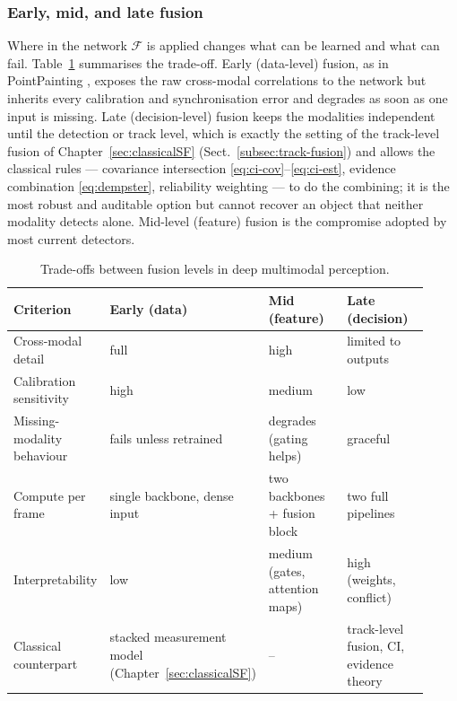 \subsubsection*{Early, mid, and late fusion}
Where in the network $\mathcal{F}$ is applied changes what can be learned and what can fail. Table~\ref{tab:fusion-level-tradeoff} summarises the trade-off. Early (data-level) fusion, as in PointPainting \cite{vora2020_pointpainting}, exposes the raw cross-modal correlations to the network but inherits every calibration and synchronisation error and degrades as soon as one input is missing. Late (decision-level) fusion keeps the modalities independent until the detection or track level, which is exactly the setting of the track-level fusion of Chapter~\ref{sec:classicalSF} (Sect.~\ref{subsec:track-fusion}) and allows the classical rules --- covariance intersection \eqref{eq:ci-cov}--\eqref{eq:ci-est}, evidence combination \eqref{eq:dempster}, reliability weighting --- to do the combining; it is the most robust and auditable option but cannot recover an object that neither modality detects alone. Mid-level (feature) fusion is the compromise adopted by most current detectors.
\begin{table}[!t]
    \centering
    \small
    \setlength{\tabcolsep}{4pt}
    \caption{Trade-offs between fusion levels in deep multimodal perception.}
    \label{tab:fusion-level-tradeoff}
    \begin{tabular}{p{0.17\linewidth} p{0.25\linewidth} p{0.25\linewidth} p{0.25\linewidth}}
        \hline
        \textbf{Criterion} & \textbf{Early (data)} & \textbf{Mid (feature)} & \textbf{Late (decision)} \\
        \hline
        Cross-modal detail & full & high & limited to outputs \\
        Calibration sensitivity & high & medium & low \\
        Missing-modality behaviour & fails unless retrained & degrades (gating helps) & graceful \\
        Compute per frame & single backbone, dense input & two backbones + fusion block & two full pipelines \\
        Interpretability & low & medium (gates, attention maps) & high (weights, conflict) \\
        Classical counterpart & stacked measurement model (Chapter~\ref{sec:classicalSF}) & -- & track-level fusion, CI, evidence theory \\
        \hline
    \end{tabular}
\end{table}

